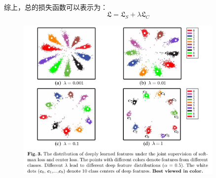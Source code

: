 \documentclass[10pt,letterpaper]{article}
\begin{document}
\paragraph{} 综上，总的损失函数可以表示为：
\begin{equation}
	\mathfrak{L} = \mathfrak{L}_S + \lambda \mathfrak{L}_C
\end{equation}
\begin{figure}[H]
	\centering
	\includegraphics[width=0.9\textwidth]{../images/center-loss.png}
	\caption{}
	\label{softmax-loss-2-d}
\end{figure}





















\newpage


\end{document}
